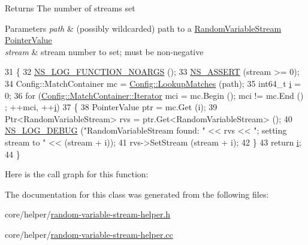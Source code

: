 \begin{DoxyReturn}{Returns}
The number of streams set 
\end{DoxyReturn}

\begin{DoxyParams}{Parameters}
{\em path} & (possibly wildcarded) path to a \hyperlink{classns3_1_1RandomVariableStream}{Random\+Variable\+Stream} \hyperlink{classns3_1_1PointerValue}{Pointer\+Value} \\
\hline
{\em stream} & stream number to set; must be non-\/negative \\
\hline
\end{DoxyParams}

\begin{DoxyCode}
31 \{
32   \hyperlink{log-macros-disabled_8h_a8f7e4afc291c9d29a65c18ac1f79197b}{NS\_LOG\_FUNCTION\_NOARGS} ();
33   \hyperlink{assert_8h_a6dccdb0de9b252f60088ce281c49d052}{NS\_ASSERT} (stream >= 0);
34   Config::MatchContainer mc = \hyperlink{group__config_ga74aeb63f8f50b4a98043351552ef7db6}{Config::LookupMatches} (path);
35   int64\_t \hyperlink{bernuolliDistribution_8m_a6f6ccfcf58b31cb6412107d9d5281426}{i} = 0;
36   \textcolor{keywordflow}{for} (\hyperlink{classns3_1_1Config_1_1MatchContainer_a00de4b7cc8ea02e8e33209f92e65fa0f}{Config::MatchContainer::Iterator} mci = mc.Begin (); mci != mc.End ()
      ; ++mci, ++\hyperlink{bernuolliDistribution_8m_a6f6ccfcf58b31cb6412107d9d5281426}{i})
37     \{
38       PointerValue ptr = mc.Get (i);
39       Ptr<RandomVariableStream> rvs = ptr.Get<RandomVariableStream> ();
40       \hyperlink{group__logging_ga413f1886406d49f59a6a0a89b77b4d0a}{NS\_LOG\_DEBUG} (\textcolor{stringliteral}{"RandomVariableStream found: "} << rvs << \textcolor{stringliteral}{"; setting stream to "} << (stream 
      + i));
41       rvs->SetStream (stream + i);
42     \}
43   \textcolor{keywordflow}{return} \hyperlink{bernuolliDistribution_8m_a6f6ccfcf58b31cb6412107d9d5281426}{i};
44 \}
\end{DoxyCode}


Here is the call graph for this function\+:




The documentation for this class was generated from the following files\+:\begin{DoxyCompactItemize}
\item 
core/helper/\hyperlink{random-variable-stream-helper_8h}{random-\/variable-\/stream-\/helper.\+h}\item 
core/helper/\hyperlink{random-variable-stream-helper_8cc}{random-\/variable-\/stream-\/helper.\+cc}\end{DoxyCompactItemize}
